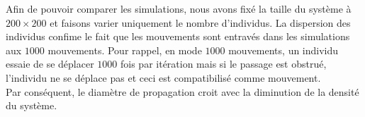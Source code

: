 Afin de pouvoir comparer les simulations, nous avons fixé la taille du système à $200 \times 200$ et faisons varier uniquement le nombre d'individus. La dispersion des individus confime le fait que les mouvements sont entravés dans les simulations aux $1000$ mouvements. Pour rappel, en mode $1000$ mouvements, un individu essaie de se déplacer $1000$ fois par itération mais si le passage est obstrué, l'individu ne se déplace pas et ceci est compatibilisé comme mouvement.\\

Par conséquent, le diamètre de propagation croit avec la diminution de la densité du système. 